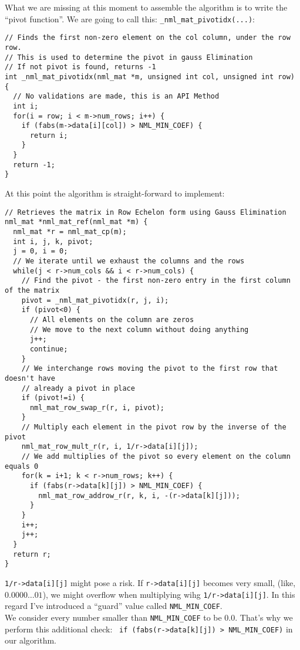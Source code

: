 What we are missing at this moment to assemble the algorithm is to write the ``pivot function''. We are going to call this: {\tt \_nml\_mat\_pivotidx(...)}:

\begin{verbatim}
// Finds the first non-zero element on the col column, under the row row.
// This is used to determine the pivot in gauss Elimination
// If not pivot is found, returns -1
int _nml_mat_pivotidx(nml_mat *m, unsigned int col, unsigned int row) {
  // No validations are made, this is an API Method
  int i;
  for(i = row; i < m->num_rows; i++) {
    if (fabs(m->data[i][col]) > NML_MIN_COEF) {
      return i;
    }
  }
  return -1;
}
\end{verbatim}

At this point the algorithm is straight-forward to implement:

\begin{verbatim}
// Retrieves the matrix in Row Echelon form using Gauss Elimination
nml_mat *nml_mat_ref(nml_mat *m) {
  nml_mat *r = nml_mat_cp(m);
  int i, j, k, pivot;
  j = 0, i = 0;
  // We iterate until we exhaust the columns and the rows
  while(j < r->num_cols && i < r->num_cols) {
    // Find the pivot - the first non-zero entry in the first column of the matrix
    pivot = _nml_mat_pivotidx(r, j, i);
    if (pivot<0) {
      // All elements on the column are zeros
      // We move to the next column without doing anything
      j++;
      continue;
    }
    // We interchange rows moving the pivot to the first row that doesn't have
    // already a pivot in place
    if (pivot!=i) {
      nml_mat_row_swap_r(r, i, pivot);
    }
    // Multiply each element in the pivot row by the inverse of the pivot
    nml_mat_row_mult_r(r, i, 1/r->data[i][j]);
    // We add multiplies of the pivot so every element on the column equals 0
    for(k = i+1; k < r->num_rows; k++) {
      if (fabs(r->data[k][j]) > NML_MIN_COEF) {
        nml_mat_row_addrow_r(r, k, i, -(r->data[k][j]));
      } 
    }
    i++;
    j++;
  }
  return r;
} 
\end{verbatim}

{\tt 1/r->data[i][j]} might pose a risk. If {\tt r->data[i][j]} becomes very small, (like, $0.0000\ldots 01$), we might overflow when multiplying wihg {\tt 1/r->data[i][j]}. In this regard I’ve introduced a ``guard'' value called {\tt NML\_MIN\_COEF}.
\\

We consider every number smaller than {\tt NML\_MIN\_COEF} to be 0.0. That’s why we perform this additional check: \ {\tt if (fabs(r->data[k][j]) > NML\_MIN\_COEF)} in our algorithm.

